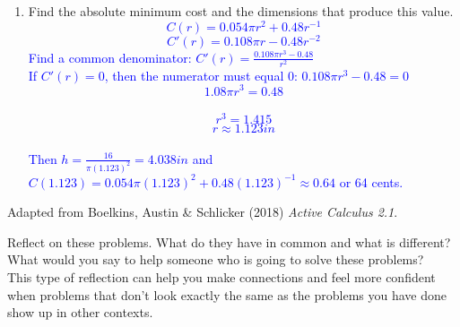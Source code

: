 \documentclass{ximera}
\begin{document}
\begin{exercise}
\begin{enumerate}
\begin{image}
           \end{image}
        \item Find the absolute minimum cost and the dimensions that produce this value.\\
         \textcolor{blue}{\[C(r)=0.054\pi r^2+0.48r^{-1}\]
         \[C'(r)=0.108\pi r-0.48r^{-2}\]
        Find a common denominator: $C'(r)=\frac{0.108\pi r^3-0.48}{r^2}$\\
        If $C'(r)=0$, then the numerator must equal 0: $0.108\pi r^3-0.48=0$\\
        \[1.08\pi r^3=0.48\]\\
        \[r^3=1.415\]
        \[r\approx 1.123in\]\\
        Then $h=\frac{16}{\pi(1.123)^2}=4.038in$ and $C(1.123)=0.054\pi (1.123)^2+0.48(1.123)^{-1}\approx 0.64$ or 64 cents.} 
    \end{enumerate}
    Adapted from Boelkins, Austin \& Schlicker (2018) \textit{Active Calculus 2.1}.
\end{exercise}

\begin{exercise}
    Reflect on these problems.  What do they have in common and what is different?  What would you say to help someone who is going to solve these problems? \\
    This type of reflection can help you make connections and feel more confident when problems that don't look exactly the same as the problems you have done show up in other contexts.
\end{exercise}
\end{document}
